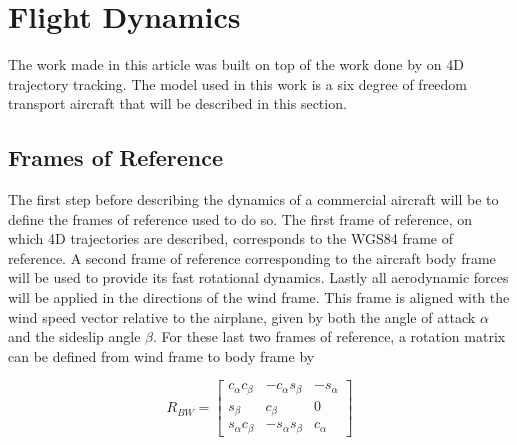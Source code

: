 
\section{Flight Dynamics}
\label{sec:backg}

The work made in this article was built on top of the work done by \cite{hector} on 4D trajectory tracking. The model used in this work is a six degree of freedom transport aircraft that will be described in this section. 

\subsection{Frames of Reference}

The first step before describing the dynamics of a commercial aircraft will be to define the frames of reference used to do so. The first frame of reference, on which 4D trajectories are described, corresponds to the WGS84 frame of reference. A second frame of reference corresponding to the aircraft body frame will be used to provide its fast rotational dynamics. Lastly all aerodynamic forces will be applied in the directions of the wind frame. This frame is aligned with the wind speed vector relative to the airplane, given by both the angle of attack $\alpha$ and the sideslip angle $\beta$. For these last two frames of reference, a rotation matrix can be defined from wind frame to body frame by


\begin{equation}
R_{BW}=
\begin{bmatrix}
c_\alpha c_\beta & -c_\alpha s_\beta & -s_\alpha \\
s_\beta & c_\beta & 0 \\
s_\alpha c_\beta & -s_\alpha s_\beta & c_\alpha
\end{bmatrix}
\label{eq:wind2body}
\end{equation}

